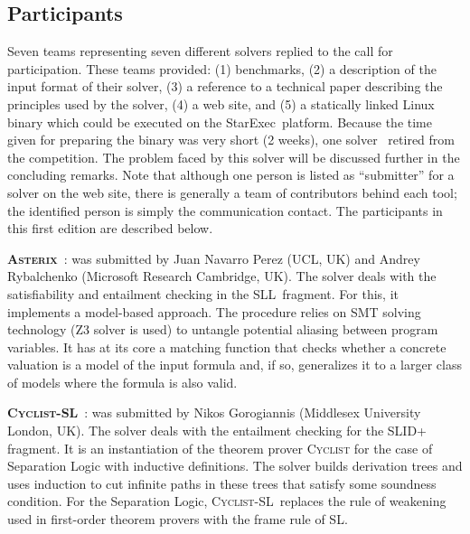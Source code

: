 \documentclass[twoside,11pt]{article}
\newcommand{\SLRD}{\textsc{SLID}}
\newcommand{\SLL}{\textsc{SLL}}
\newcommand{\ASTERIX}{\textsc{Asterix}}
\newcommand{\CYCLIST}{\textsc{Cyclist-SL}}
\newcommand{\starexec}{\textsf{StarExec}}
\begin{document}
\subsection{Participants}
Seven teams representing seven different solvers replied to the call for participation.
These teams provided:
(1) benchmarks, 
(2) a description of the input format of their solver, 
(3) a reference to a technical paper describing the principles used by the solver, 
(4) a web site, and
(5) a statically linked Linux binary which could be executed on the \starexec\ platform.
%
Because the time given for preparing the binary was very short (2 weeks), one solver~\cite{HasseIOP13}
retired from the competition. The problem faced by this solver will be discussed further in the concluding remarks.
%
Note that although one person is listed as ``submitter'' for a solver on the web site,
there is generally a team of contributors behind each tool; the identified person is simply the communication contact.
%
The participants in this first edition are described below.

\smallskip
\noindent
\textbf{\ASTERIX}~\cite{PerezR13}: 
was submitted by 
Juan Navarro Perez (UCL, UK) and 
Andrey Rybalchenko (Microsoft Research Cambridge, UK).
The solver deals with the satisfiability and entailment checking in the \SLL\ fragment.
For this, it implements a model-based approach.
The procedure relies on SMT solving technology (Z3 solver is used) to untangle potential aliasing between program variables. 
It has at its core a matching function that checks whether a concrete valuation is a model of the input formula and, if so, generalizes it to a larger class of models where the formula is also valid.  


\medskip
\noindent
\textbf{\CYCLIST}~\cite{BrotherstonGP12,CYCLISTsite}:
was submitted by 
Nikos Gorogiannis (Middlesex University London, UK).
The solver deals with the entailment checking for the \SLRD+ fragment.
It is an instantiation of the theorem prover \textsc{Cyclist} for the case of Separation Logic with inductive definitions. 
The solver builds derivation trees and uses induction to cut infinite paths in these trees
that satisfy some soundness condition. 
For the Separation Logic, \CYCLIST\ replaces the rule of weakening used in first-order theorem provers with the frame rule of SL.
\end{document}
